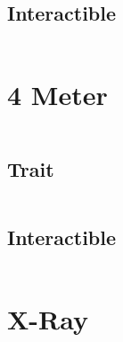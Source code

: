 \documentclass[main.tex]{subfiles}
\begin{document}
\begin{lstlisting}[language=FG]
\end{lstlisting}


\subsection{Interactible}
\begin{lstlisting}[language=FG]

\end{lstlisting}
\section{4 Meter}

\begin{lstlisting}[language=FG]
\end{lstlisting}

\subsection{Trait}

\begin{lstlisting}[language=FG]
\end{lstlisting}


\subsection{Interactible}
\begin{lstlisting}[language=FG]

\end{lstlisting}

\section{X-Ray}
\end{document}
